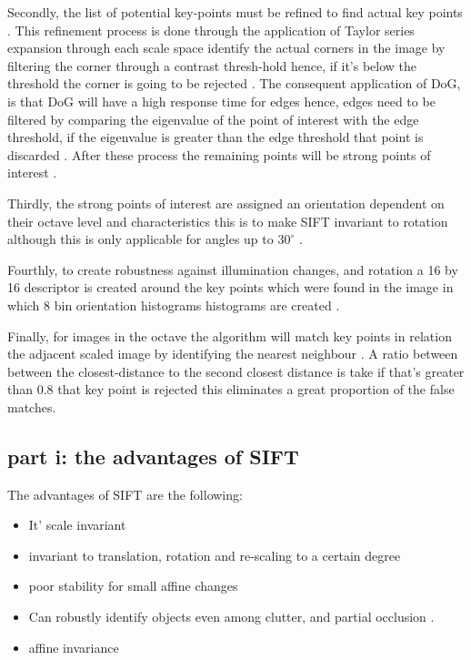 \documentclass[conference]{IEEEtran}
\begin{document}
Secondly, the list of potential key-points must be refined to find actual key points \cite{b3}. This refinement process is done through the application of Taylor series expansion through each scale space identify the actual corners in the image by filtering the corner through a contrast thresh-hold hence, if it's below the threshold the corner is going to be rejected \cite{b3}. The consequent application of DoG, is that DoG will have a high response time for edges hence, edges need to be filtered by comparing the eigenvalue of the point of interest with the edge threshold, if the eigenvalue is greater than the edge threshold that point is discarded \cite{b3}. After these process the remaining points  will be strong points of interest \cite{b3}. \par


Thirdly, the strong points of interest are assigned an orientation dependent on their octave level and characteristics this is to make SIFT invariant to rotation although this is only applicable for angles up to $30^{\circ}$ \cite{b3}. \par

Fourthly, to create robustness against illumination changes, and rotation a 16 by 16 descriptor is created around the key points which were found in the image in which 8 bin orientation histograms histograms are created \cite{b3}.

Finally, for images in the octave the algorithm will match key points in relation the adjacent scaled image by identifying the nearest neighbour \cite{b3}. A ratio between between the closest-distance to the second closest distance is take if that's greater than 0.8 that key point is rejected this eliminates a great proportion of the false matches.
\subsection{part i: the advantages of SIFT}
The advantages of SIFT are the following:
\begin{itemize}
	\item It' scale invariant \cite{b8}
	\item invariant to translation, rotation and re-scaling to a certain degree \cite{b8}
	\item poor stability for small affine changes \cite{b13}
	\item Can robustly identify objects even among clutter, and partial occlusion \cite{b13}. 
	\item affine invariance \cite{b13}
\end{itemize}
\end{document}
